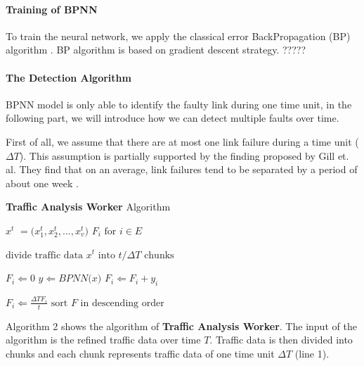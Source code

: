 \documentclass{sig-alternate-05-2015}
\begin{document}
\paragraph{Training of BPNN}
To train the neural network, we apply the classical error BackPropagation (BP) algorithm \cite{rumelhart1988learning}. BP algorithm is based on gradient descent strategy.
????? %

\paragraph{The Detection Algorithm}
BPNN model is only able to identify the faulty link during one time unit, in the following part, we will introduce how we can detect multiple faults over time.

First of all, we assume that there are at most one link failure during a time unit ($\Delta T$). This assumption is partially supported by the finding proposed by Gill et. al. They find that on an average, link failures tend to be separated by a period of about one week \cite{gill2011understanding}.

\renewcommand{\algorithmicrequire}{\textbf{Input:}}
\renewcommand{\algorithmicensure}{\textbf{Output:}}
\begin{algorithm}
	\caption{\textbf{Traffic Analysis Worker} Algorithm}
	\begin{algorithmic}[1]
        \REQUIRE \boldmath $x^t$ \unboldmath$=($\boldmath $x_1^t, x_2^t, ..., x_v^t$\unboldmath $)$
		\ENSURE $F_i \text{ for } i \in E$
       
        \STATE $\text{divide traffic data }$\boldmath $x^t$$\text{ into }$\unboldmath $t/\Delta T \text{ chunks}$
        
            \STATE $F_i \Leftarrow 0$
        \ENDFOR
        \STATE \boldmath $y$\unboldmath $\Leftarrow BPNN($\boldmath $x$\unboldmath $)$
                \STATE $F_i \Leftarrow F_i + y_i$
            \ENDFOR
        \ENDFOR
        
            \STATE $F_i \Leftarrow \frac{\Delta T F_i}{t}$
        \ENDFOR
        \STATE $\text{sort }$\boldmath $F$\unboldmath$\text{ in descending order}$
	\end{algorithmic}
\end{algorithm}

Algorithm 2 shows the algorithm of \textbf{Traffic Analysis Worker}. The input of the algorithm is the refined traffic data over time $T$. Traffic data is then divided into chunks and each chunk represents traffic data of one time unit $\Delta T$ (line 1).
\end{document}
